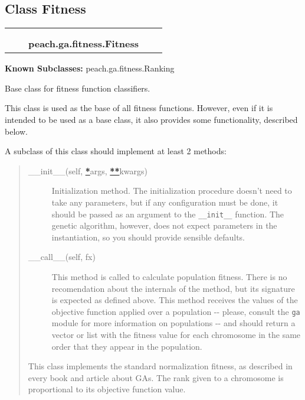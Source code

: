 
\subsection{Class Fitness}

    \label{peach:ga:fitness:Fitness}
\begin{tabular}{cccccc}
\multicolumn{2}{r}{\settowidth{\BCL}{object}\multirow{2}{\BCL}{object}}
&&
  \\\cline{3-3}
  &&\multicolumn{1}{c|}{}
&&
  \\
&&\multicolumn{2}{l}{\textbf{peach.ga.fitness.Fitness}}
\end{tabular}

\textbf{Known Subclasses:} peach.ga.fitness.Ranking


Base class for fitness function classifiers.

This class is used as the base of all fitness functions. However, even if
it is intended to be used as a base class, it also provides some
functionality, described below.

A subclass of this class should implement at least 2 methods:
%
\begin{quote}
%
\begin{description}
\item[{\_\_init\_\_(self, %
\hyperlink{id1}{\textbf{\color{red}*}}args, %
\hyperlink{id3}{\textbf{\color{red}**}}kwargs)}] \leavevmode 
Initialization method. The initialization procedure doesn't need to take
any parameters, but if any configuration must be done, it should be
passed as an argument to the \texttt{\_\_init\_\_} function. The genetic
algorithm, however, does not expect parameters in the instantiation, so
you should provide sensible defaults.

\item[{\_\_call\_\_(self, fx)}] \leavevmode 
This method is called to calculate population fitness. There is no
recomendation about the internals of the method, but its signature is
expected as defined above. This method receives the values of the
objective function applied over a population -{}- please, consult the
\texttt{ga} module for more information on populations -{}- and should return a
vector or list with the fitness value for each chromosome in the same
order that they appear in the population.

\end{description}

This class implements the standard normalization fitness, as described in
every book and article about GAs. The rank given to a chromosome is
proportional to its objective function value.

\end{quote}

